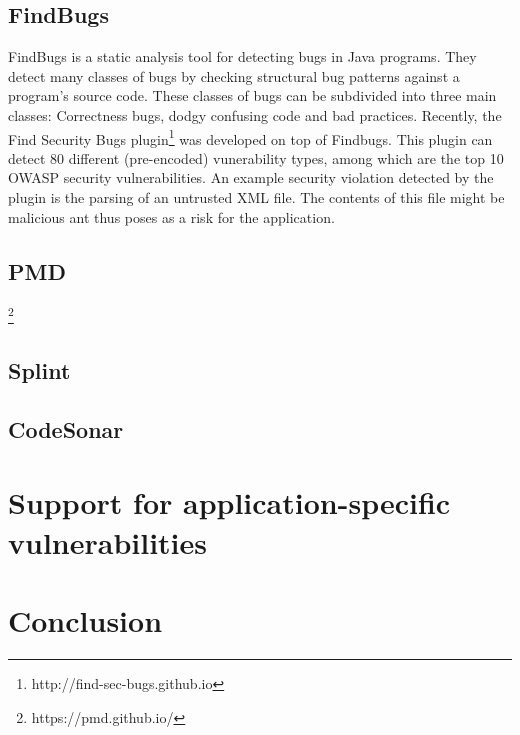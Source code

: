 \subsection*{FindBugs}

FindBugs\cite{Findbugs} is a static analysis tool for detecting bugs in Java programs. They detect many classes of bugs by checking structural bug patterns against a program's source code. These classes of bugs can be subdivided into three main classes: Correctness bugs, dodgy confusing code and bad practices. Recently, the Find Security Bugs plugin\footnote{http://find-sec-bugs.github.io} was developed on top of Findbugs. This plugin can detect 80 different (pre-encoded) vunerability types, among which are the top 10 OWASP security vulnerabilities. An example security violation detected by the plugin is the parsing of an untrusted XML file. The contents of this file might be malicious ant thus poses as a risk for the application.

\subsection*{PMD}
\footnote{https://pmd.github.io/}
\subsection*{Splint}
\cite{splint}
\subsection*{CodeSonar}
\cite{CodeSonar}


\section{Support for application-specific vulnerabilities}
\label{sec:applicationSpecificVulnerabilities}
\section{Conclusion}
